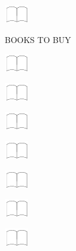 \documentclass[11pt,titlepage]{article}
\begin{document}
\vspace{12mm}

\noindent
\includegraphics[]{book.pdf}

\pagebreak

\small
\hfill BOOKS TO BUY

\vspace{6mm}

\noindent
\includegraphics[]{book.pdf}

\vspace{12mm}

\noindent
\includegraphics[]{book.pdf}

\vspace{12mm}

\noindent
\includegraphics[]{book.pdf}

\vspace{12mm}

\noindent
\includegraphics[]{book.pdf}

\vspace{12mm}

\noindent
\includegraphics[]{book.pdf}

\vspace{12mm}

\noindent
\includegraphics[]{book.pdf}

\vspace{12mm}

\noindent
\includegraphics[]{book.pdf}
\end{document}
